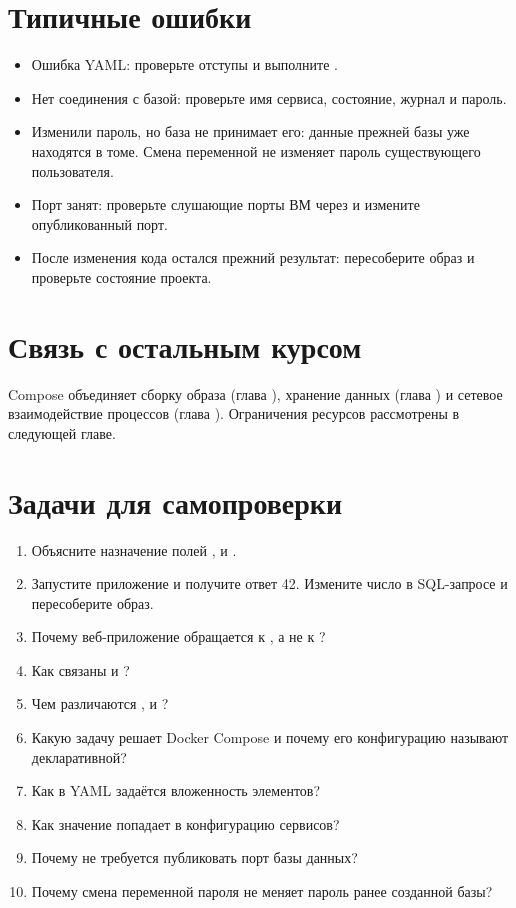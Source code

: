\section{Типичные ошибки}
\begin{itemize}[nosep]
  \item Ошибка YAML: проверьте отступы и выполните .
  \item Нет соединения с базой: проверьте имя сервиса, состояние, журнал  и пароль.
  \item Изменили пароль, но база не принимает его: данные прежней базы уже находятся в томе. Смена переменной не изменяет пароль существующего пользователя.
  \item Порт занят: проверьте слушающие порты ВМ через  и измените опубликованный порт.
  \item После изменения кода остался прежний результат: пересоберите образ и проверьте состояние проекта.
\end{itemize}

\par\begin{samepage}
\section{Связь с остальным курсом}

Compose объединяет сборку образа (глава ), хранение данных (глава ) и сетевое взаимодействие процессов (глава ). Ограничения ресурсов рассмотрены в следующей главе.\par

\section{Задачи для самопроверки}
\begin{enumerate}[nosep]
  \item Объясните назначение полей ,  и .
  \item Запустите приложение и получите ответ 42. Измените число в SQL-запросе и пересоберите образ.
  \item Почему веб-приложение обращается к , а не к ?
  \item Как связаны  и ?
  \item Чем различаются ,  и ?
  \item Какую задачу решает Docker Compose и почему его конфигурацию называют декларативной?
  \item Как в YAML задаётся вложенность элементов?
  \item Как значение  попадает в конфигурацию сервисов?
  \item Почему не требуется публиковать порт базы данных?
  \item Почему смена переменной пароля не меняет пароль ранее созданной базы?
\end{enumerate}
\end{samepage}
\par
\clearpage
\endgroup